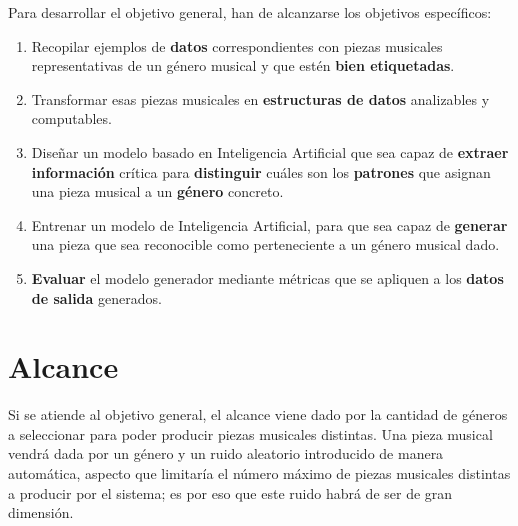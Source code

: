 Para desarrollar el objetivo general, han de alcanzarse los objetivos específicos:

\begin{enumerate}
    \item Recopilar ejemplos de \textbf{datos} correspondientes con piezas musicales representativas de un género musical y que estén \textbf{bien etiquetadas}.
    
    \item Transformar esas piezas musicales en \textbf{estructuras de datos} analizables y computables.

    \item Diseñar un modelo basado en Inteligencia Artificial que sea capaz de \textbf{extraer información} crítica para \textbf{distinguir} cuáles son los \textbf{patrones} que asignan una pieza musical a un \textbf{género} concreto.

    \item Entrenar un modelo de Inteligencia Artificial, para que sea capaz de \textbf{generar} una pieza que sea reconocible como perteneciente a un género musical dado.

    \item \textbf{Evaluar} el modelo generador mediante métricas que se apliquen a los \textbf{datos de salida} generados.
\end{enumerate}

\section{Alcance}
Si se atiende al objetivo general, el alcance viene dado por la cantidad de géneros a seleccionar para poder producir piezas musicales distintas. Una pieza musical vendrá dada por un género y un ruido aleatorio introducido de manera automática, aspecto que limitaría el número máximo de piezas musicales distintas a producir por el sistema; es por eso que este ruido habrá de ser de gran dimensión.


